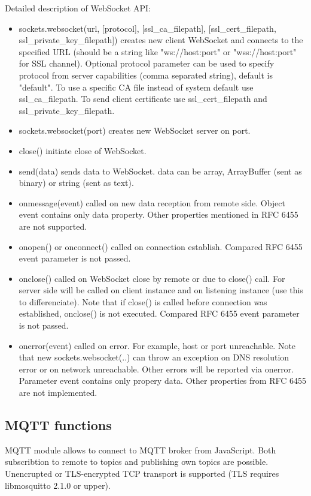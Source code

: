 Detailed description of WebSocket API:
\begin{itemize}
\item sockets.websocket(url, [protocol], [ssl\_ca\_filepath], [ssl\_cert\_filepath, 
ssl\_private\_key\_filepath]) creates new client WebSocket and connects to the 
specified URL (should be a string like "ws://host:port" or "wss://host:port" for 
SSL channel). Optional protocol parameter can be used to specify protocol from server 
capabilities (comma separated string), default is "default". To use a specific CA file 
instead of system default use ssl\_ca\_filepath. To send client certificate use  ssl\_cert\_filepath and ssl\_private\_key\_filepath.
\item sockets.websocket(port) creates new WebSocket server on port.
\item close() initiate close of WebSocket.
\item send(data) sends data to WebSocket. data can be array, ArrayBuffer (sent as binary) or string (sent as text).
\item onmessage(event) called on new data reception from remote side. Object event contains only data property. Other properties mentioned in RFC 6455 are not supported.
\item onopen() or onconnect() called on connection establish. Compared RFC 6455 event parameter is not passed.
\item onclose() called on WebSocket close by remote or due to close() call. For server side will be called on client instance and on listening instance (use this to differenciate). Note that if close() is called before connection was established, onclose() is not executed. Compared RFC 6455 event parameter is not passed.
\item onerror(event) called on error. For example, host or port unreachable. Note that new sockets.websocket(..) can throw an exception on DNS resolution error or on network unreachable. Other errors will be reported via onerror. Parameter event contains only propery data. Other properties from RFC 6455 are not implemented.
\end{itemize}

\subsection{MQTT functions}

MQTT module allows to connect to MQTT broker from JavaScript.
Both subscribtion to remote to topics and publishing own topics are possible.
Unencrupted or TLS-encrypted TCP transport is supported (TLS requires libmosquitto 2.1.0 or upper).

